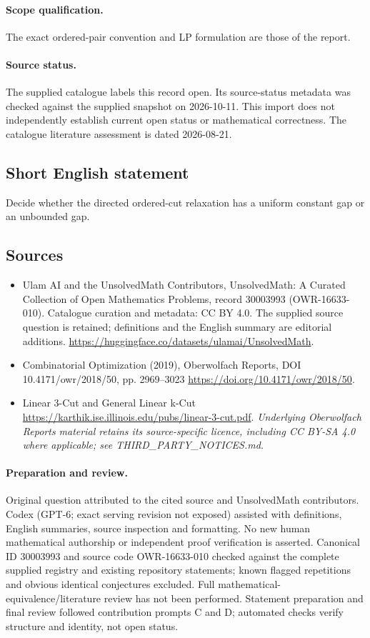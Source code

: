 \documentclass[11pt]{article}
\begin{document}
\paragraph{Scope qualification.}
The exact ordered-pair convention and LP formulation are those of the report.
\paragraph{Source status.}
The supplied catalogue labels this record open. Its source-status metadata was checked against the supplied snapshot on 2026-10-11. This import does not independently establish current open status or mathematical correctness. The catalogue literature assessment is dated 2026-08-21.
\subsection{Short English statement}
Decide whether the directed ordered-cut relaxation has a uniform constant gap or an unbounded gap.
\subsection{Sources}
\begin{itemize}
\item[S1] Ulam AI and the UnsolvedMath Contributors, UnsolvedMath: A Curated Collection of Open Mathematics Problems, record 30003993 (OWR-16633-010). Catalogue curation and metadata: CC BY 4.0. The supplied source question is retained; definitions and the English summary are editorial additions.
\url{https://huggingface.co/datasets/ulamai/UnsolvedMath}.
\item[S2] Combinatorial Optimization (2019), Oberwolfach Reports, DOI 10.4171/owr/2018/50, pp. 2969--3023
\url{https://doi.org/10.4171/owr/2018/50}.
\item[S3] Linear 3-Cut and General Linear k-Cut
\url{https://karthik.ise.illinois.edu/pubs/linear-3-cut.pdf}.
\textit{Underlying Oberwolfach Reports material retains its source-specific licence, including CC BY-SA 4.0 where applicable; see THIRD\_PARTY\_NOTICES.md.}
\end{itemize}
\paragraph{Preparation and review.}
Original question attributed to the cited source and UnsolvedMath contributors. Codex (GPT-6; exact serving revision not exposed) assisted with definitions, English summaries, source inspection and formatting. No new human mathematical authorship or independent proof verification is asserted. Canonical ID 30003993 and source code OWR-16633-010 checked against the complete supplied registry and existing repository statements; known flagged repetitions and obvious identical conjectures excluded. Full mathematical-equivalence/literature review has not been performed. Statement preparation and final review followed contribution prompts C and D; automated checks verify structure and identity, not open status.
\label{end:30003993}
\end{document}
